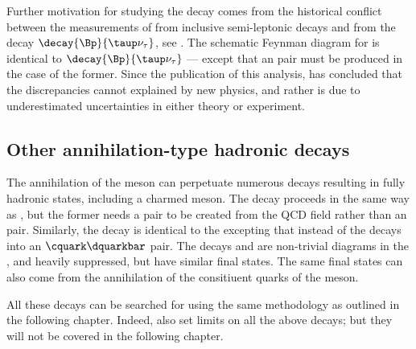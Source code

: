 Further motivation for studying the decay \btodsphi comes from the
historical conflict between the measurements of  from inclusive semi-leptonic decays and
from the decay $\decay{\Bp}{\taup\nu_\tau}$, see .
The schematic Feynman diagram for \btodsphi is identical to $\decay{\Bp}{\taup\nu_\tau}$
--- except that an \ssbar pair must be produced in the case of the former.
Since the publication of this analysis,  has concluded that the
discrepancies cannot explained by new physics, and rather is due to underestimated uncertainties in
either theory or experiment.









\subsection{Other annihilation-type hadronic decays}
The annihilation of the \Bp meson can perpetuate numerous decays resulting in fully hadronic
states, including a charmed meson.
The decay \decay{\Bp}{\Dp\Kstarz} proceeds in the same way as
\btodsphi, but the former needs a \ddbar pair to be created from the QCD field rather than an
\ssbar pair.
Similarly, the decay \decay{\Bp}{\Ds\Kstarzb} is identical to the \btodsphi excepting that instead
of \decay{\Wp}{\cquark\squarkbar} the \Wp decays into an $\cquark\dquarkbar$ pair.
The decays \decay{\Bp}{\Dp\Kstarzb} and \decay{\Bp}{\Ds\Kstarz} are non-trivial diagrams in the
\sm, and heavily suppressed, but have similar final states.
The same final states can also come from the annihilation of the consitiuent
quarks of the \Bc meson.

All these decays can be searched for using the same methodology as outlined in the following
chapter.
Indeed,  also set limits on all the above decays; but they will not be
covered in the following chapter.

































